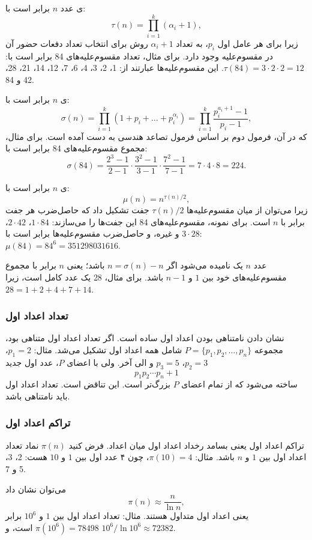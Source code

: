 ی عدد $n$ برابر است با:
\[\tau(n)=\prod_{i=1}^k (\alpha_i+1),\]
زیرا برای هر عامل اول $p_i$، به تعداد $\alpha_i+1$
روش برای انتخاب تعداد دفعات حضور آن
در مقسوم‌علیه وجود دارد.
برای مثال، تعداد مقسوم‌علیه‌های 84 برابر است با:
$\tau(84)=3 \cdot 2 \cdot 2 = 12$.
این مقسوم‌علیه‌ها عبارتند از:
1، 2، 3، 4، 6، 7، 12، 14، 21، 28، 42 و 84.

ی $n$ برابر است با:
\[\sigma(n)=\prod_{i=1}^k (1+p_i+\ldots+p_i^{\alpha_i}) = \prod_{i=1}^k \frac{p_i^{a_i+1}-1}{p_i-1},\]
که در آن، فرمول دوم بر اساس فرمول تصاعد هندسی به دست آمده است.
برای مثال، مجموع مقسوم‌علیه‌های 84 برابر است با:
\[\sigma(84)=\frac{2^3-1}{2-1} \cdot \frac{3^2-1}{3-1} \cdot \frac{7^2-1}{7-1} = 7 \cdot 4 \cdot 8 = 224.\]

ی $n$ برابر است با:
\[\mu(n)=n^{\tau(n)/2},\]
زیرا می‌توان از میان مقسوم‌علیه‌ها $\tau(n)/2$ جفت تشکیل داد
که حاصل‌ضرب هر جفت برابر با $n$ است.
برای نمونه، مقسوم‌علیه‌های 84 این جفت‌ها را می‌سازند:
$1 \cdot 84$، $2 \cdot 42$، $3 \cdot 28$ و غیره،
و حاصل‌ضرب مقسوم‌علیه‌ها برابر است با: $\mu(84)=84^6=351298031616$.


عدد $n$ یک  نامیده می‌شود اگر $n=\sigma(n)-n$ باشد؛
یعنی $n$ برابر با مجموع مقسوم‌علیه‌های خود
بین $1$ و $n-1$ باشد.
برای مثال، 28 یک عدد کامل است،
زیرا $28=1+2+4+7+14$.

\subsubsection{تعداد اعداد اول}

نشان دادن نامتناهی بودن اعداد اول ساده است.
اگر تعداد اعداد اول متناهی بود،
مجموعه $P=\{p_1,p_2,\ldots,p_n\}$
شامل همه اعداد اول تشکیل می‌شد.
مثال: $p_1=2$، $p_2=3$، $p_3=5$ و الی آخر.
ولی با اعضای $P$، عدد اول جدید
\[p_1 p_2 \cdots p_n+1\]
ساخته می‌شود
که از تمام اعضای $P$ بزرگ‌تر است.
این تناقض است. تعداد اعداد اول باید نامتناهی باشد.

\subsubsection{تراکم اعداد اول}

تراکم اعداد اول یعنی بسامد رخداد اعداد اول میان اعداد.
فرض کنید $\pi(n)$ نماد تعداد اعداد اول بین
$1$ و $n$ باشد. مثال: $\pi(10)=4$، چون
۴ عدد اول بین $1$ و $10$ هست: 2، 3، 5 و 7.

می‌توان نشان داد
\[\pi(n) \approx \frac{n}{\ln n},\]
یعنی اعداد اول متداول هستند.
مثال: تعداد اعداد اول بین
$1$ و $10^6$ برابر $\pi(10^6)=78498$ است،
و $10^6 / \ln 10^6 \approx 72382$.

